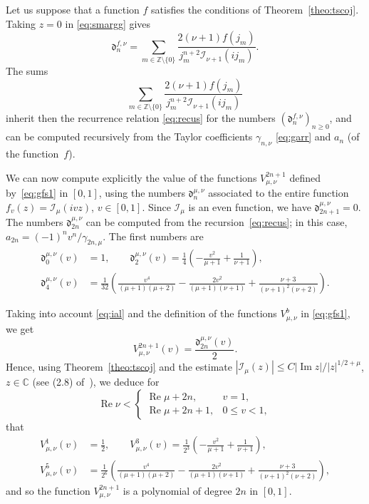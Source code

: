 \documentclass[10pt,a4paper]{article}
\numberwithin{equation}{section}
\theoremstyle{plain}
\theoremstyle{definition}
\newcommand{\I}{\mathcal{I}}
\newcommand{\dd}{\mathfrak{d}}
\newcommand{\CC}{\mathbb{C}}
\newcommand{\ZZO}{\mathbb{Z} \setminus \{0\}}
\renewcommand{\Im}{\operatorname{Im}}
\renewcommand{\Re}{\operatorname{Re}}
\begin{document}
Let us suppose that a function $f$ satisfies the conditions of Theorem~\ref{theo:tscoj}.
Taking $z=0$ in \eqref{eq:smargg} gives
\[
   \dd_n^{f,\nu} = \sum_{m\in\ZZO} \frac{2(\nu+1)f(j_m)}{j_m^{n+2}\I_{\nu+1}(ij_m)}.
\]
The sums
\[
   \sum_{m\in\ZZO} \frac{2(\nu+1)f(j_m)}{j_m^{n+2}\I_{\nu+1}(ij_m)}
\]
inherit then the recurrence relation \eqref{eq:recus} for the numbers $(\dd_n^{f,\nu})_{n\ge 0}$, and can be computed recursively from the Taylor coefficients $\gamma_{n,\nu}$ \eqref{eq:garr} and $a_n$ (of the function~$f$).

We can now compute explicitly the value of the functions $V_{\mu,\nu}^{2n+1}$ defined by~\eqref{eq:gfs1} in $[0,1]$, using the numbers $\dd_n^{\mu,\nu}$ associated to the entire function $f_v(z)=\I_\mu (ivz)$, $v\in[0,1]$. Since $\I_\mu$ is an even function, we have $\dd_{2n+1}^{\mu,\nu}=0$. The numbers $\dd_{2n}^{\mu,\nu}$ can be computed from the recursion~\eqref{eq:recus}; in this case, $a_{2n}=(-1)^nv^n/\gamma_{2n,\mu}$. The first numbers are
\begin{align*}
   \dd_{0}^{\mu,\nu}(v) &= 1,
   \qquad
   \dd_{2}^{\mu,\nu}(v) = \frac{1}{4}\left(-\frac{v^2}{\mu +1}+\frac{1}{\nu +1} \right),
   \\
   \dd_{4}^{\mu,\nu}(v) &= \frac{1}{32} \left(
   \frac{v^4}{(\mu +1)(\mu+2)}-\frac{2v^2}{(\mu +1)(\nu+1)}+\frac{\nu+3}{(\nu +1)^2(\nu+2)}
   \right).
\end{align*}

Taking into account \eqref{eq:ial} and the definition of the functions $V_{\mu,\nu}^b$ in \eqref{eq:gfs1}, we get
\begin{equation}
\label{eq:vdb}
   V_{\mu,\nu}^{2n+1}(v) = \frac{\dd_{2n}^{\mu,\nu}(v)}{2}.
\end{equation}
Hence, using Theorem~\ref{theo:tscoj} and the estimate
$|\I_\mu (z)| \le C {|\Im z|}/{|z|^{1/2+\mu}}$, $z\in \CC$
(see (2.8) of~\cite{DPV}), we deduce for
\[
   \Re \nu < \begin{cases}
   \Re \mu +2n, &v =1,
   \\
   \Re \mu +2n+1, &0\le v<1,
   \end{cases}
\]
that 
\begin{align}
\label{eq:ddab0}
   V_{\mu,\nu}^1(v) &= \frac{1}{2},
   \qquad
   V_{\mu,\nu}^3(v) = \frac{1}{2^{3}} \left(-\frac{v^2}{\mu +1}+\frac{1}{\nu +1}\right),
   \\
\label{eq:ddab2}
   V_{\mu,\nu}^5(v) &= \frac{1}{2^{6}}
   \left(
   \frac{v^4}{(\mu +1)(\mu+2)}-\frac{2v^2}{(\mu +1)(\nu+1)}+\frac{\nu+3}{(\nu +1)^2(\nu+2)}
   \right),
\end{align}
and so the function $V_{\mu,\nu}^{2n+1}$ is a polynomial of degree $2n$ in $[0,1]$. 
\end{document}
